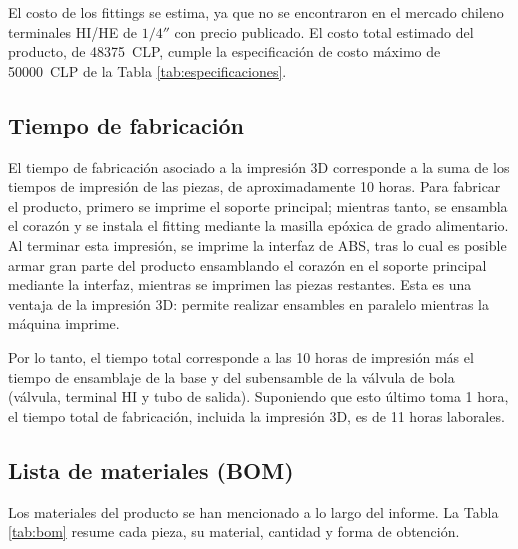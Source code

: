 \documentclass[12pt, a4paper]{article}
\begin{document}
El costo de los fittings se estima, ya que no se encontraron en el mercado chileno terminales HI/HE de $1/4''$ con precio publicado. El costo total estimado del producto, de \num{48375}~CLP, cumple la especificación de costo máximo de \num{50000}~CLP de la Tabla \ref{tab:especificaciones}.

\subsection{Tiempo de fabricación}

El tiempo de fabricación asociado a la impresión 3D corresponde a la suma de los tiempos de impresión de las piezas, de aproximadamente 10 horas. Para fabricar el producto, primero se imprime el soporte principal; mientras tanto, se ensambla el corazón y se instala el fitting mediante la masilla epóxica de grado alimentario. Al terminar esta impresión, se imprime la interfaz de ABS, tras lo cual es posible armar gran parte del producto ensamblando el corazón en el soporte principal mediante la interfaz, mientras se imprimen las piezas restantes. Esta es una ventaja de la impresión 3D: permite realizar ensambles en paralelo mientras la máquina imprime.

Por lo tanto, el tiempo total corresponde a las 10 horas de impresión más el tiempo de ensamblaje de la base y del subensamble de la válvula de bola (válvula, terminal HI y tubo de salida). Suponiendo que esto último toma 1 hora, el tiempo total de fabricación, incluida la impresión 3D, es de 11 horas laborales.

\subsection{Lista de materiales (BOM)}
\label{sec:bom}

Los materiales del producto se han mencionado a lo largo del informe. La Tabla \ref{tab:bom} resume cada pieza, su material, cantidad y forma de obtención.
\end{document}
